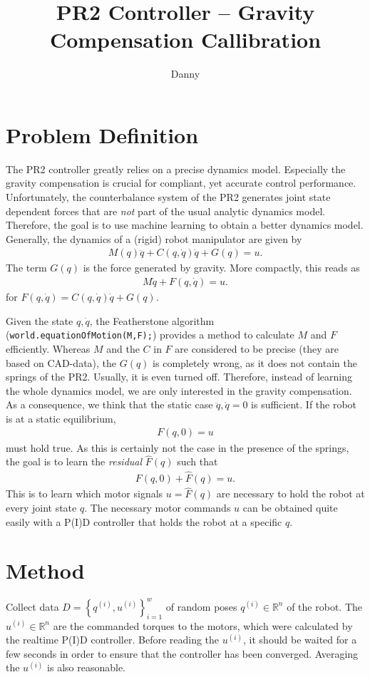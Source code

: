 \documentclass[10pt,fleqn,twoside]{article}
\title{PR2 Controller -- Gravity Compensation Callibration}
\author{Danny}
\begin{document}
\maketitle
\section{Problem Definition}
The PR2 controller greatly relies on a precise dynamics model. Especially the gravity compensation is crucial for compliant, yet accurate control performance. Unfortunately, the counterbalance system of the PR2 generates joint state dependent forces that are \emph{not} part of the usual analytic dynamics model. Therefore, the goal is to use machine learning to obtain a better dynamics model. Generally, the dynamics of a (rigid) robot manipulator are given by
\begin{align}
	M(q)\ddot{q}+C(q,\dot{q})\dot{q}+G(q) = u.
\end{align}
The term $G(q)$ is the force generated by gravity. More compactly, this reads as
\begin{align}
	M\ddot{q}+F(q,\dot{q}) = u.
\end{align}
for $F(q,\dot{q}) = C(q,\dot{q})\dot{q}+G(q)$.

Given the state $q,\dot{q}$, the Featherstone algorithm (\texttt{world.equationOfMotion(M,F);}) provides a method to calculate $M$ and $F$ efficiently. Whereas $M$ and the $C$ in $F$ are considered to be precise (they are based on CAD-data), the $G(q)$ is completely wrong, as it does not contain the springs of the PR2. Usually, it is even turned off. Therefore, instead of learning the whole dynamics model, we are only interested in the gravity compensation. As a consequence, we think that the static case $\ddot{q},\dot{q} = 0$ is sufficient. If the robot is at a static equilibrium,
\begin{align}
	F(q,0) = u
\end{align}
must hold true. As this is certainly not the case in the presence of the springs, the goal is to learn the \emph{residual} $\widehat{F}(q)$ such that
\begin{align}
	F(q,0) + \widehat{F}(q) = u.
\end{align}
This is to learn which motor signals $u=\widehat{F}(q)$ are necessary to hold the robot at every joint state $q$. The necessary motor commands $u$ can be obtained quite easily with a P(I)D controller that holds the robot at a specific $q$.
\section{Method}
Collect data $D=\left\{q^{(i)},u^{(i)}\right\}_{i=1}^w$ of random poses $q^{(i)}\in\mathbb{R}^n$ of the robot. The $u^{(i)}\in\mathbb{R}^n$ are the commanded torques to the motors, which were calculated by the realtime P(I)D controller. Before reading the $u^{(i)}$, it should be waited for a few seconds in order to ensure that the controller has been converged. Averaging the $u^{(i)}$ is also reasonable. 
\end{document}
